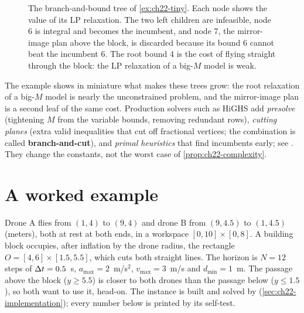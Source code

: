 \begin{figure}[tb]
  \centering
  \caption{The branch-and-bound tree of \cref{ex:ch22-tiny}. Each node shows
  the value of its LP relaxation. The two left children are infeasible, node
  6 is integral and becomes the incumbent, and node 7, the mirror-image plan
  above the block, is discarded because its bound $6$ cannot beat the
  incumbent $6$. The root bound $4$ is the cost of flying straight through
  the block: the LP relaxation of a big-$M$ model is weak.}
  \label{fig:ch22-bnb}
\end{figure}

The example shows in miniature what makes these trees grow: the root
relaxation of a big-$M$ model is nearly the unconstrained problem, and the
mirror-image plan is a second leaf of the same cost. Production solvers such as HiGHS add \emph{presolve} (tightening
$M$ from the variable bounds, removing redundant rows), \emph{cutting
planes} (extra valid inequalities that cut off fractional vertices;
the combination is called \textbf{branch-and-cut}),
and \emph{primal heuristics} that find incumbents early; see
\textcite{wolsey1998integer}. They change the constants, not the worst case
of \cref{prop:ch22-complexity}.

\section{A worked example}
\label{sec:ch22-example}

\begin{example}
\label{ex:ch22-two}
Drone A flies from $(1, 4)$ to $(9, 4)$ and drone B from $(9, 4.5)$ to
$(1, 4.5)$ (meters), both at rest at both ends, in a workspace $[0,10] \times
[0,8]$. A building block occupies, after inflation by the drone radius, the
rectangle $O = [4,6] \times [1.5, 5.5]$, which cuts both straight lines. The
horizon is $N = 12$ steps of $\Delta t = 0.5$~s, $a_{\max} = 2$~m/s$^2$,
$v_{\max} = 3$~m/s and $d_{\min} = 1$~m. The passage above the block
($y \ge 5.5$) is closer to both drones than the passage below ($y \le 1.5$),
so both want to use it, head-on. The instance is built and solved by
 (\cref{sec:ch22-implementation}); every number
below is printed by its self-test.
\end{example}

